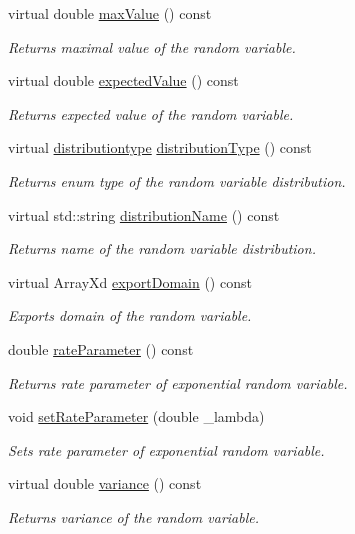 \begin{DoxyCompactItemize}
virtual double \hyperlink{class_c_exponential_c_r_v_a61b1bfbcfcdc924c906dee4813c82b7a}{max\-Value} () const 
\begin{DoxyCompactList}\small\item\em Returns maximal value of the random variable. \end{DoxyCompactList}\item 
virtual double \hyperlink{class_c_exponential_c_r_v_a5ddbb30be4118a0795c3b56b2daee5da}{expected\-Value} () const 
\begin{DoxyCompactList}\small\item\em Returns expected value of the random variable. \end{DoxyCompactList}\item 
virtual \hyperlink{class_c_random_variable_a80d2a87c43847274138b51f7d713d7f1}{distributiontype} \hyperlink{class_c_exponential_c_r_v_adc5a1bf708580ac1ac2c35a3bb927373}{distribution\-Type} () const 
\begin{DoxyCompactList}\small\item\em Returns enum type of the random variable distribution. \end{DoxyCompactList}\item 
virtual std\-::string \hyperlink{class_c_exponential_c_r_v_a871b1ca0531fd6599d6415bfdae5bb98}{distribution\-Name} () const 
\begin{DoxyCompactList}\small\item\em Returns name of the random variable distribution. \end{DoxyCompactList}\item 
virtual Array\-Xd \hyperlink{class_c_exponential_c_r_v_ad346c5b30597b2a2a5ae3315ba8e35a4}{export\-Domain} () const 
\begin{DoxyCompactList}\small\item\em Exports domain of the random variable. \end{DoxyCompactList}\item 
double \hyperlink{class_c_exponential_c_r_v_a19c6cea6f5899279fc8a59b0c056f462}{rate\-Parameter} () const 
\begin{DoxyCompactList}\small\item\em Returns rate parameter of exponential random variable. \end{DoxyCompactList}\item 
void \hyperlink{class_c_exponential_c_r_v_a3433bb5b8060066c31c81790a252e4fe}{set\-Rate\-Parameter} (double \-\_\-lambda)
\begin{DoxyCompactList}\small\item\em Sets rate parameter of exponential random variable. \end{DoxyCompactList}\item 
virtual double \hyperlink{class_c_exponential_c_r_v_a8f0e52d384a6256289f528b1b94aaedc}{variance} () const 
\begin{DoxyCompactList}\small\item\em Returns variance of the random variable. \end{DoxyCompactList}\end{DoxyCompactItemize}
